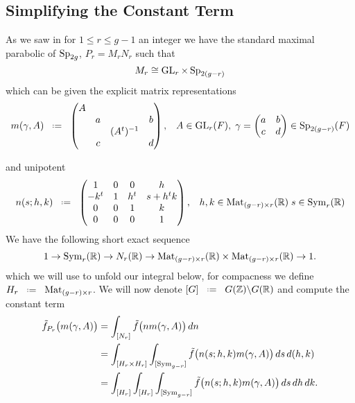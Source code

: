 \subsection{Simplifying the Constant Term}
As we saw in  for \(1\leq r\leq g-1\) an integer we have the standard maximal parabolic of \(\operatorname{Sp}_{2g}\), \(P_r = M_rN_r\) such that 
\[M_r \cong \operatorname{GL}_r\times \operatorname{Sp}_{2(g-r)}\]
which can be given the explicit matrix representations 
    \[m(\gamma, A) \defeq \begin{pmatrix}
        A &&& \\
         &a&&b \\
         &&(A^t)\inv& \\
         &c&&d \\
    \end{pmatrix}, \;\;\; A\in \GL_r(F), \; \gamma = \begin{pmatrix}
        a & b\\
        c & d \\
    \end{pmatrix} \in \Sp_{2(g-r)}(F) \]

    and unipotent 
    \[ n(s;h,k) \defeq \begin{pmatrix} 1 & 0 & 0 & h\\ -k^t & 1 & h^t & s+h^t k\\ 0 & 0 & 1 & k\\ 0 & 0 & 0 & 1 \end{pmatrix}, \;\;\; h, k\in\mathrm{Mat}_{(g-r)\times r}(\R)\; s\in\mathrm{Sym}_{r}(\R)\]
We have the following short exact sequence 
\[ 1\to \mathrm{Sym}_{r}(\R)\to N_r(\R)\to \mathrm{Mat}_{(g-r)\times r}(\R)\times\mathrm{Mat}_{(g-r)\times r}(\R) \to 1. \]
which we will use to unfold our integral below, for compacness we define \(H_r \defeq \mathrm{Mat}_{(g-r)\times r}\). We will now denote \([G] \defeq G(\Z)\backslash G(\R)\) and compute the constant term
\begin{align}
		\tilde f_{P_r}\bigl(m(\gamma, A)\bigr)
		& = \int^{}_{[N_r]}\tilde f\bigl(n m(\gamma, A)\bigr)\,dn \notag\\
		& = \int^{}_{[H_r\times H_r]}\int^{}_{[\mathrm{Sym}_{g-r}]}\tilde f\bigl(n(s; h, k) m(\gamma, A)\bigr)\,ds\,d(h,k) \notag\\
		& = \int^{}_{[H_r]}\int^{}_{[H_r]}\int^{}_{[\mathrm{Sym}_{g-r}]}\tilde f\bigl(n(s; h, k) m(\gamma, A)\bigr)\,ds\,dh\,dk.
\end{align} 

